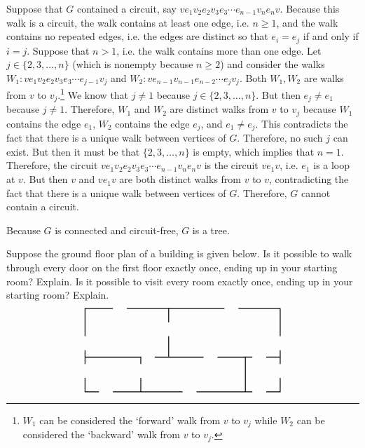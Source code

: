 \documentclass[11pt,letterpaper]{article}
\begin{document}
Suppose that $G$ contained a circuit, say $v e_1 v_2 e_2 v_3 e_3 \cdots e_{n-1} v_n e_n v$. Because this walk is a circuit, the walk contains at least one edge, i.e. $n \geq 1$, and the walk contains no repeated edges, i.e. the edges are distinct so that $e_i= e_j$ if and only if $i= j$. Suppose that $n > 1$, i.e. the walk contains more than one edge. Let $j \in \{ 2, 3, \ldots, n \}$ (which is nonempty because $n \geq 2$) and consider the walks $W_1: v e_1 v_2 e_2 v_3 e_3 \cdots e_{j-1} v_j$ and $W_2: v e_{n-1} v_{n-1} e_{n-2} \cdots e_j v_j$. Both $W_1, W_2$ are walks from $v$ to $v_j$.\footnote{$W_1$ can be considered the `forward' walk from $v$ to $v_j$ while $W_2$ can be considered the `backward' walk from $v$ to $v_j$.} We know that $j \neq 1$ because $j \in \{ 2, 3, \ldots, n \}$. But then $e_j \neq e_1$ because $j \neq 1$. Therefore, $W_1$ and $W_2$ are distinct walks from $v$ to $v_j$ because $W_1$ contains the edge $e_1$, $W_2$ contains the edge $e_j$, and $e_1 \neq e_j$. This contradicts the fact that there is a unique walk between vertices of $G$. Therefore, no such $j$ can exist. But then it must be that $\{ 2, 3, \ldots, n \}$ is empty, which implies that $n= 1$. Therefore, the circuit $v e_1 v_2 e_2 v_3 e_3 \cdots e_{n-1} v_n e_n v$ is the circuit $v e_1 v$, i.e. $e_1$ is a loop at $v$. But then $v$ and $ve_1v$ are both distinct walks from $v$ to $v$, contradicting the fact that there is a unique walk between vertices of $G$. Therefore, $G$ cannot contain a circuit. \pspace

Because $G$ is connected and circuit-free, $G$ is a tree. 



\newpage



 Suppose the ground floor plan of a building is given below. Is it possible to walk through every door on the first floor exactly once, ending up in your starting room? Explain. Is it possible to visit every room exactly once, ending up in your starting room? Explain. \pspace 
	\[
	\graphSix
	\] \pspace






















\newpage
\end{document}
